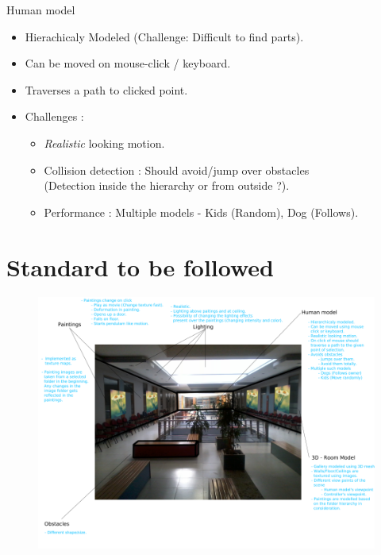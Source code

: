 \documentclass[color=usenames,dvipsnames]{beamer}
\begin{document}
\begin{frame}{Human model}

\begin{itemize}

\setlength{\itemsep}{20pt}
  
\item Hierachicaly Modeled (Challenge: Difficult to find parts).
  
\item Can be moved on mouse-click / keyboard.

\item Traverses a path to clicked point.
  
\item Challenges :


\begin{itemize}

\setlength{\itemsep}{12pt}

\vspace {2mm}
  
\item \emph{Realistic} looking motion.  
  
\item Collision detection : Should avoid/jump over obstacles \\(Detection inside the hierarchy or from outside ?).

\item Performance : Multiple models - Kids (Random), Dog (Follows).

\end{itemize}

\end{itemize}
\end{frame}

\section{Standard to be followed}

\begin{frame}{}

\begin{figure}[h!]  
  \centering
  \includegraphics[width=1\textwidth]{3D-ArtGallery.png}  
  \end{figure} 
\end{frame}
\end{document}
